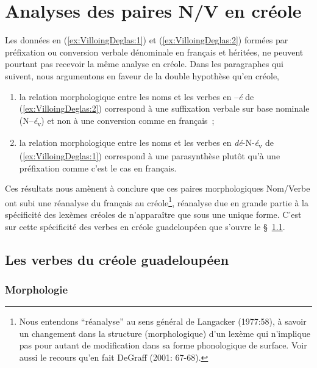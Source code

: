 \documentclass[output=paper]{langsci/langscibook}
\begin{document}
\section{Analyses des paires N/V en
créole}\label{section:VilloingDeglas:analyses-des-paires-nv-en-créole}

Les données en (\ref{ex:VilloingDeglas:1}) et (\ref{ex:VilloingDeglas:2}) formées par préfixation ou conversion verbale
dénominale en français et héritées, ne peuvent pourtant pas recevoir la
même analyse en créole. Dans les paragraphes qui suivent, nous
argumentons en faveur de la double hypothèse qu'en créole,

\begin{enumerate}\def\labelenumi{(\roman{enumi})}

\item
  la relation morphologique entre les noms et les verbes en --\emph{é}
  de (\ref{ex:VilloingDeglas:2}) correspond à une suffixation verbale sur base nominale
  (N--\emph{é}\textsubscript{v}) et non à une conversion comme en français~;
\item
  la relation morphologique entre les noms et les verbes en
  \emph{dé}-N-\emph{é}\textsubscript{v} de (\ref{ex:VilloingDeglas:1}) correspond à une parasynthèse plutôt
  qu'à une préfixation comme c'est le cas en français.
\end{enumerate}

Ces résultats nous amènent à conclure que ces paires morphologiques
Nom/Verbe ont subi une réanalyse du français au créole\footnote{Nous
  entendons \enquote{réanalyse} au sens général de Langacker (1977:58), à
  savoir un changement dans la structure (morphologique) d'un lexème
  qui n'implique pas pour autant de modification dans sa forme
  phonologique de surface. Voir aussi le recours qu'en fait DeGraff
  (2001: 67-68).}, réanalyse due en grande partie à la spécificité des
lexèmes créoles de n'apparaître que sous une unique forme. C'est sur
cette spécificité des verbes en créole guadeloupéen que s'ouvre le §~\ref{subsection:VilloingDeglas:les-verbes-du-creole-guadeloupeen}.

\subsection{Les verbes du créole
guadeloupéen}\label{subsection:VilloingDeglas:les-verbes-du-creole-guadeloupeen}

\subsubsection{Morphologie}\label{subsubsection:VilloingDeglas:morphologie}
\end{document}

